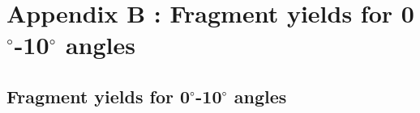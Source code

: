 \section*{Appendix B \label{AppendixB}: Fragment yields for 0$^{\circ}$-10$^{\circ}$ angles}

\renewcommand{\theequation}{B\arabic{equation}}
\setcounter{equation}{0}  
\renewcommand{\thefigure}{B\arabic{figure}}
\setcounter{figure}{0}
\renewcommand{\thetable}{B\arabic{table}}
\setcounter{table}{0}
\renewcommand\thesection{B}
\setcounter{section}{1}
\setcounter{subsection}{0}

\subsection{Fragment yields for 0$^{\circ}$-10$^{\circ}$ angles}
